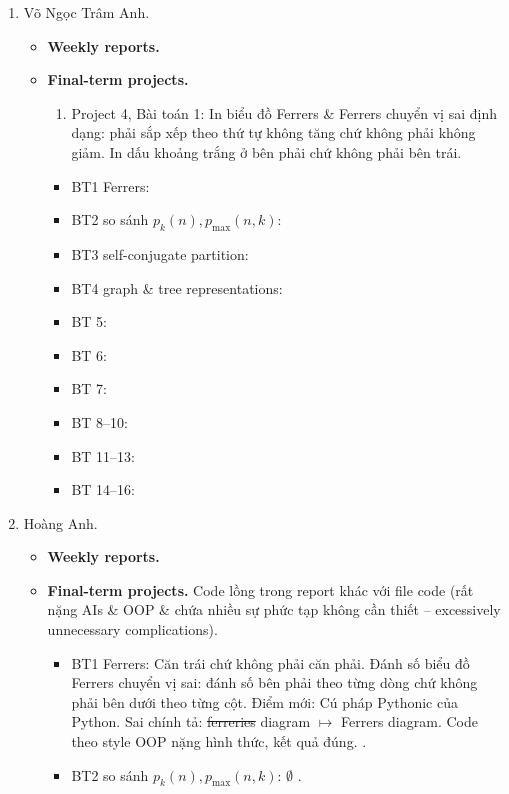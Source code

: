 \documentclass{article}
\begin{document}
\begin{enumerate}
    \item {\sc Võ Ngọc Trâm Anh.}
    \begin{itemize}
        \item {\bf Weekly reports.}
        \item {\bf Final-term projects.}
        \begin{enumerate}
            \item Project 4, Bài toán 1: In biểu đồ Ferrers \& Ferrers chuyển vị sai định dạng: phải sắp xếp theo thứ tự không tăng chứ không phải không giảm. In dấu khoảng trắng ở bên phải chứ không phải bên trái.
        \end{enumerate}
        \begin{itemize}
            \item BT1 Ferrers:
            \item BT2 so sánh $p_k(n),p_{\max}(n,k)$:
            \item BT3 self-conjugate partition:
            \item BT4 graph \& tree representations:
            \item BT 5:
            \item BT 6:
            \item BT 7:
            \item BT 8--10:
            \item BT 11--13:
            \item BT 14--16:
        \end{itemize}
    \end{itemize}
    \item {\sc Hoàng Anh.}
    \begin{itemize}
        \item {\bf Weekly reports.}
        \item {\bf Final-term projects.} Code lồng trong report khác với file code (rất nặng AIs \& OOP \& chứa nhiều sự phức tạp không cần thiết -- excessively unnecessary complications).
        \begin{itemize}
            \item BT1 Ferrers: Căn trái chứ không phải căn phải. Đánh số biểu đồ Ferrers chuyển vị sai: đánh số bên phải theo từng dòng chứ không phải bên dưới theo từng cột. Điểm mới: Cú pháp Pythonic của Python. Sai chính tả: \st{ferreries} diagram $\mapsto$ Ferrers diagram. Code theo style OOP nặng hình thức, kết quả đúng. .
            \item BT2 so sánh $p_k(n),p_{\max}(n,k)$: $\emptyset$ .

\end{itemize}
\end{itemize}
\end{enumerate}
\end{document}
